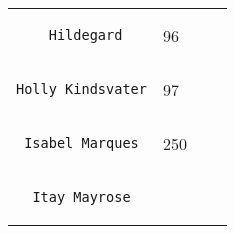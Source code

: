 \documentclass[]{article}
\begin{document}
\begin{longtable}[c]{@{}llll@{}}
\begin{minipage}[t]{0.39\columnwidth}
\begin{verbatim}
    Hildegard
\end{verbatim}
\end{minipage} & \begin{minipage}[t]{0.10\columnwidth}\raggedright
96
\end{minipage} & \begin{minipage}[t]{0.13\columnwidth}\raggedright
\end{minipage} & \begin{minipage}[t]{0.15\columnwidth}\raggedright
\end{minipage}
\\\noalign{\medskip}
\begin{minipage}[t]{0.39\columnwidth}\raggedright
\begin{verbatim}
Holly Kindsvater
\end{verbatim}
\end{minipage} & \begin{minipage}[t]{0.10\columnwidth}\raggedright
97
\end{minipage} & \begin{minipage}[t]{0.13\columnwidth}\raggedright
\end{minipage} & \begin{minipage}[t]{0.15\columnwidth}\raggedright
\end{minipage}
\\\noalign{\medskip}
\begin{minipage}[t]{0.39\columnwidth}\raggedright
\begin{verbatim}
 Isabel Marques
\end{verbatim}
\end{minipage} & \begin{minipage}[t]{0.10\columnwidth}\raggedright
250
\end{minipage} & \begin{minipage}[t]{0.13\columnwidth}\raggedright
\end{minipage} & \begin{minipage}[t]{0.15\columnwidth}\raggedright
\end{minipage}
\\\noalign{\medskip}
\begin{minipage}[t]{0.39\columnwidth}\raggedright
\begin{verbatim}
  Itay Mayrose
\end{verbatim}
\end{minipage} & \begin{minipage}[t]{0.10\columnwidth}\raggedright

\end{minipage}
\end{longtable}
\end{document}
